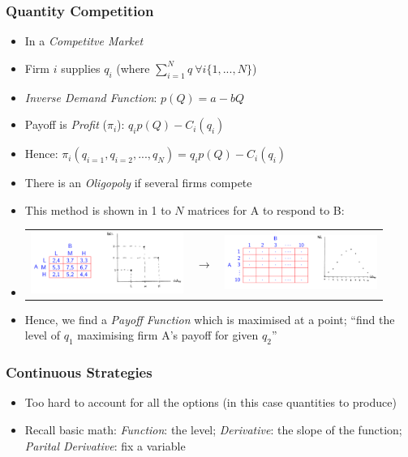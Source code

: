 \documentclass[11pt, english]{article}
\begin{document}
		\subsubsection{Quantity Competition}

	\begin{itemize}
	\setlength\itemsep{0cm}
		\item In a \textit{Competitve Market}
		\item Firm $i$ supplies $q_i$ (where $\sum_{i=1}^Nq\ \forall i\{1,...,N\}$)
		\item \textit{Inverse Demand Function}: $p(Q)=a-bQ$
		\item Payoff is \textit{Profit} ($\pi_i$): $q_ip(Q)-C_i(q_i)$
		\item Hence: $\pi_i(q_{i=1},q_{i=2},...,q_N)=q_ip(Q)-C_i(q_i)$
		\item There is an \textit{Oligopoly} if several firms compete
		\item This method is shown in 1 to $N$ matrices for A to respond to B:
		\item 
			\begin{center}
			\begin{tabular}{ccc}
				\includegraphics[width=5cm,height=2cm]{EC315-IMG/12.png} & $\longrightarrow$ & \includegraphics[width=5cm,height=2cm]{EC315-IMG/13.png}\\
			\end{tabular}
			\end{center}
		\item Hence, we find a \textit{Payoff Function} which is maximised at a point; ``find the level of $q_1$ maximising firm A's payoff for given $q_2$''
	\end{itemize}

		\subsubsection{Continuous Strategies}

	\begin{itemize}
        \setlength\itemsep{0cm}
		\item Too hard to account for all the options (in this case quantities to produce)
		\item Recall basic math: \textit{Function}: the level; \textit{Derivative}: the slope of the function; \textit{Parital Derivative}: fix a variable
	\end{itemize}
\end{document}
